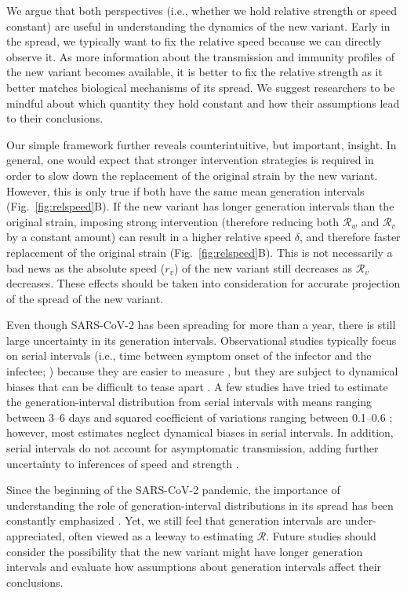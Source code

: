 \documentclass[12pt]{article}
\newcommand{\fref}[1]{Fig.~\ref{fig:#1}}
\newcommand{\RR}{\ensuremath{{\mathcal R}}\xspace}
\begin{document}
We argue that both perspectives (i.e., whether we hold relative strength or speed constant) are useful in understanding the dynamics of the new variant.
Early in the spread, we typically want to fix the relative speed because we can directly observe it.
As more information about the transmission and immunity profiles of the new variant becomes available, it is better to fix the relative strength as it better matches biological mechanisms of its spread.
We suggest researchers to be mindful about which quantity they hold constant and how their assumptions lead to their conclusions.

Our simple framework further reveals counterintuitive, but important, insight.
In general, one would expect that stronger intervention strategies is required in order to slow down the replacement of the original strain by the new variant.
However, this is only true if both have the same mean generation intervals (\fref{relspeed}B).
If the new variant has longer generation intervals than the original strain, imposing strong intervention (therefore reducing both $\RR_w$ and $\RR_v$ by a constant amount) can result in a higher relative speed $\delta$, and therefore faster replacement of the original strain (\fref{relspeed}B).
This is not necessarily a bad news as the absolute speed ($r_v$) of the new variant still decreases as $\RR_v$ decreases.
These effects should be taken into consideration for accurate projection of the spread of the new variant.

Even though SARS-CoV-2 has been spreading for more than a year, there is still large uncertainty in its generation intervals.
Observational studies typically focus on serial intervals (i.e., time between symptom onset of the infector and the infectee; \cite{svensson2007note}) because they are easier to measure \citep{griffin2020rapid}, but they are subject to dynamical biases that can be difficult to tease apart \citep{park2021forward}.
A few studies have tried to estimate the generation-interval distribution from serial intervals with means ranging between 3--6 days and squared coefficient of variations ranging between 0.1--0.6 \citep{ferretti2020quantifying,Ferretti2020timing,ganyani2020estimating,knight2020estimating}; 
however, most estimates neglect dynamical biases in serial intervals.
In addition, serial intervals do not account for asymptomatic transmission, adding further uncertainty to inferences of speed and strength \citep{park2020time}.

Since the beginning of the SARS-CoV-2 pandemic, the importance of understanding the role of generation-interval distributions in its spread has been constantly emphasized \citep{doi:10.1098/rsif.2020.0144}.
Yet, we still feel that generation intervals are under-appreciated, often viewed as a leeway to estimating $\RR$.
Future studies should consider the possibility that the new variant might have longer generation intervals and evaluate how assumptions about generation intervals affect their conclusions.


\end{document}

